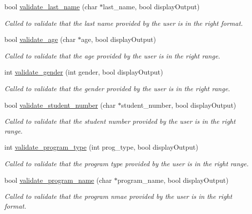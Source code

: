\begin{DoxyCompactItemize}
bool \hyperlink{class_u_i_a43f557bb9be7375662321bb2004e18a0}{validate\-\_\-last\-\_\-name} (char $\ast$last\-\_\-name, bool display\-Output)
\begin{DoxyCompactList}\small\item\em Called to validate that the last name provided by the user is in the right format. \end{DoxyCompactList}\item 
bool \hyperlink{class_u_i_af4140703b57720326794d092a98aca42}{validate\-\_\-age} (char $\ast$age, bool display\-Output)
\begin{DoxyCompactList}\small\item\em Called to validate that the age provided by the user is in the right range. \end{DoxyCompactList}\item 
int \hyperlink{class_u_i_a4107aca5745c8728f64fb98d5236d2e3}{validate\-\_\-gender} (int gender, bool display\-Output)
\begin{DoxyCompactList}\small\item\em Called to validate that the gender provided by the user is in the right range. \end{DoxyCompactList}\item 
bool \hyperlink{class_u_i_a22b503af1e9553884e7b89474060443b}{validate\-\_\-student\-\_\-number} (char $\ast$student\-\_\-number, bool display\-Output)
\begin{DoxyCompactList}\small\item\em Called to validate that the student number provided by the user is in the right range. \end{DoxyCompactList}\item 
int \hyperlink{class_u_i_ab7380eca1ba0c732034bb9cb399b44ea}{validate\-\_\-program\-\_\-type} (int prog\-\_\-type, bool display\-Output)
\begin{DoxyCompactList}\small\item\em Called to validate that the program type provided by the user is in the right range. \end{DoxyCompactList}\item 
bool \hyperlink{class_u_i_aa250863d60f72a538f4c64dd7c252fc3}{validate\-\_\-program\-\_\-name} (char $\ast$program\-\_\-name, bool display\-Output)
\begin{DoxyCompactList}\small\item\em Called to validate that the program nmae provided by the user is in the right format. \end{DoxyCompactList}\end{DoxyCompactItemize}


